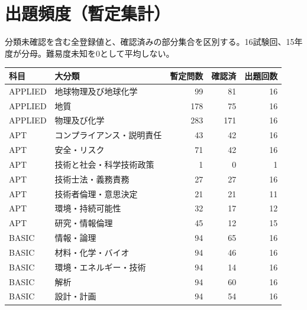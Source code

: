 \chapter{出題頻度（暫定集計）}
分類未確認を含む全登録値と、確認済みの部分集合を区別する。16試験回、15年度が分母。難易度未知を0として平均しない。
\begin{longtable}{p{.16\linewidth}p{.42\linewidth}rrr}
科目 & 大分類 & 暫定問数 & 確認済 & 出題回数\\\hline
APPLIED & 地球物理及び地球化学 & 99 & 81 & 16\\
APPLIED & 地質 & 178 & 75 & 16\\
APPLIED & 物理及び化学 & 283 & 171 & 16\\
APT & コンプライアンス・説明責任 & 43 & 42 & 16\\
APT & 安全・リスク & 71 & 42 & 16\\
APT & 技術と社会・科学技術政策 & 1 & 0 & 1\\
APT & 技術士法・義務責務 & 27 & 27 & 16\\
APT & 技術者倫理・意思決定 & 21 & 21 & 11\\
APT & 環境・持続可能性 & 32 & 17 & 12\\
APT & 研究・情報倫理 & 45 & 12 & 15\\
BASIC & 情報・論理 & 94 & 65 & 16\\
BASIC & 材料・化学・バイオ & 94 & 46 & 16\\
BASIC & 環境・エネルギー・技術 & 94 & 14 & 16\\
BASIC & 解析 & 94 & 60 & 16\\
BASIC & 設計・計画 & 94 & 54 & 16\\
\end{longtable}
